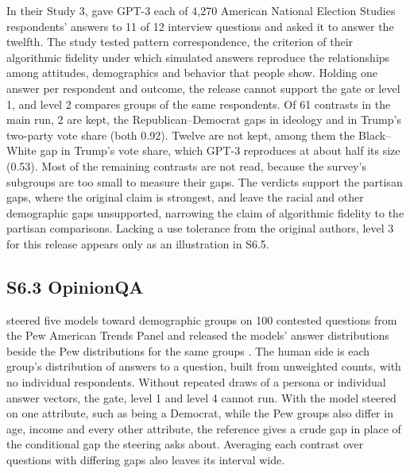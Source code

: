 In their Study 3, \citet{argyle2023outofone} gave GPT-3 each of 4,270 American National Election Studies respondents' answers to 11 of 12 interview questions and asked it to answer the twelfth. %
The study tested pattern correspondence, the criterion of their algorithmic fidelity under which simulated answers reproduce the relationships among attitudes, demographics and behavior that people show.
Holding one answer per respondent and outcome, the release cannot support the gate or level 1, and level 2 compares groups of the same respondents.
Of 61 contrasts in the main run, 2 are kept, the Republican--Democrat gaps in ideology and in Trump's two-party vote share (both 0.92). %
Twelve are not kept, among them the Black--White gap in Trump's vote share, which GPT-3 reproduces at about half its size (0.53). %
Most of the remaining contrasts are not read, because the survey's subgroups are too small to measure their gaps. %
The verdicts support the partisan gaps, where the original claim is strongest, and leave the racial and other demographic gaps unsupported, narrowing the claim of algorithmic fidelity to the partisan comparisons.
Lacking a use tolerance from the original authors, level 3 for this release appears only as an illustration in S6.5.

\subsection*{S6.3 OpinionQA}

\citet{meister2025distributional} steered five models toward demographic groups on 100 contested questions from the Pew American Trends Panel and released the models' answer distributions beside the Pew distributions for the same groups \citep{santurkar2023whose}.
The human side is each group's distribution of answers to a question, built from unweighted counts, with no individual respondents.
Without repeated draws of a persona or individual answer vectors, the gate, level 1 and level 4 cannot run.
With the model steered on one attribute, such as being a Democrat, while the Pew groups also differ in age, income and every other attribute, the reference gives a crude gap in place of the conditional gap the steering asks about.
Averaging each contrast over questions with differing gaps also leaves its interval wide.

